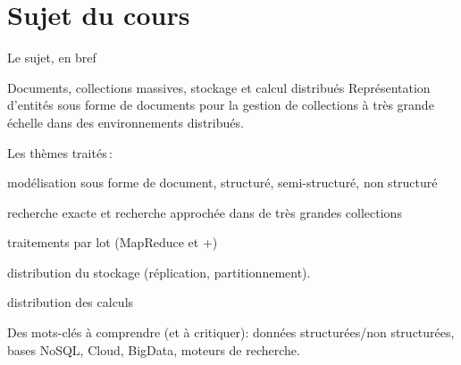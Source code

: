 \renewcommand{\titreDiapos}{Essai}%

\section{Sujet du cours}


\begin{frame}{Le sujet, en bref}

\begin{defblock}{Documents, collections massives, stockage et calcul distribués}
Représentation d'entités sous forme de  \alert{documents}
pour la gestion de \alert{collections} à très grande échelle dans des environnements distribués.
\end{defblock}

\vfill

Les thèmes traités\,:

\begin{redbullet}
  \item \alert{modélisation} sous forme  de \alert{document}, structuré, semi-structuré, non structuré
  \item \alert{recherche exacte} et  \alert{recherche approchée} dans de très grandes collections
  \item \alert{traitements par lot} (MapReduce et +)
  \item \alert{distribution du stockage} (réplication, partitionnement).
  \item \alert{distribution des calculs}
\end{redbullet}

\vfill
\begin{blocgauche}
Des mots-clés à comprendre (et à critiquer): données structurées/non structurées, bases NoSQL, Cloud, BigData,
moteurs de recherche.
\end{blocgauche}
\end{frame}


